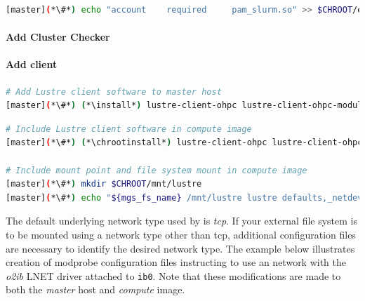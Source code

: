 \documentclass[letterpaper]{article}
\newcommand{\install}{yum -y install}
\newcommand{\chrootinstall}{yum -y --installroot=\$CHROOT install}
\begin{document}


\begin{lstlisting}[language=bash,keywords={},upquote=true]
[master](*\#*) echo "account    required     pam_slurm.so" >> $CHROOT/etc/pam.d/sshd
\end{lstlisting}

\paragraph{Add Cluster Checker} \label{sec:add_clck}


\paragraph{Add \Lustre{} client} \label{sec:lustre_client}




\begin{lstlisting}[language=bash,keywords={},upquote=true]
# Add Lustre client software to master host
[master](*\#*) (*\install*) lustre-client-ohpc lustre-client-ohpc-modules
\end{lstlisting}

\begin{lstlisting}[language=bash,keywords={},upquote=true]
# Include Lustre client software in compute image
[master](*\#*) (*\chrootinstall*) lustre-client-ohpc lustre-client-ohpc-modules

# Include mount point and file system mount in compute image
[master](*\#*) mkdir $CHROOT/mnt/lustre
[master](*\#*) echo "${mgs_fs_name} /mnt/lustre lustre defaults,_netdev,localflock 0 0" >> $CHROOT/etc/fstab
\end{lstlisting}

The default underlying network type used by \Lustre{} is {\em tcp}. If your
external \Lustre{} file system is to be mounted using a network type other than
tcp, additional configuration files are necessary to identify the desired
network type. The example below illustrates creation of modprobe configuration files
instructing \Lustre{} to use an \InfiniBand{} network with the {\em o2ib} LNET driver
attached to \texttt{ib0}. Note that these modifications are made to both the
{\em master} host and {\em compute} image.
\end{document}
